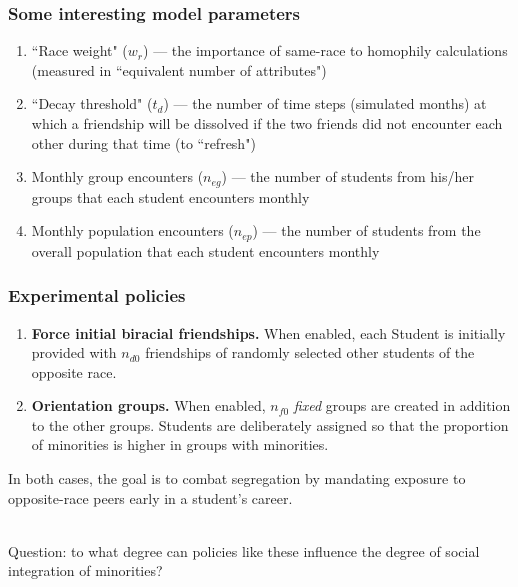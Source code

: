 \documentclass{beamer}
\begin{document}
\begin{frame}
\frametitle{Some interesting model parameters}

\begin{enumerate}
\item ``Race weight" ($w_r$) --- the importance of same-race to homophily
calculations (measured in ``equivalent number of attributes")

\item ``Decay threshold" ($t_d$) --- the number of time steps (simulated
months) at which a friendship will be dissolved if the two friends did not
encounter each other during that time (to ``refresh")

\item Monthly group encounters ($n_{eg}$) --- the number of students from
his/her groups that each student encounters monthly

\item Monthly population encounters ($n_{ep}$) --- the number of students from
the overall population that each student encounters monthly

\end{enumerate}

\end{frame}

\begin{frame}
\frametitle{Experimental policies}

\begin{enumerate}

\item \textbf{Force initial biracial friendships.} When enabled, each Student
is initially provided with $n_{d0}$ friendships of randomly selected other
students of the opposite race.

\item \textbf{Orientation groups.} When enabled, $n_{f0}$ \textit{fixed}
groups are created in addition to the other groups. Students are deliberately
assigned so that the proportion of minorities is higher in groups with
minorities.

\end{enumerate}

In both cases, the goal is to combat segregation by mandating exposure to
opposite-race peers early in a student's career.

~~\\

Question: to what degree can policies like these influence the degree of social
integration of minorities?
\end{frame}
\end{document}
